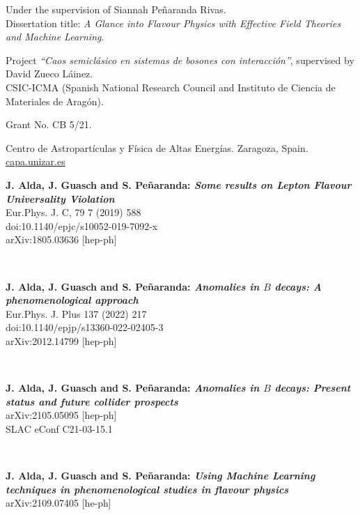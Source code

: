 \documentclass{cvf}
\begin{document}
Under the supervision of Siannah Peñaranda Rivas.\\
Dissertation title: \textit{A Glance into Flavour Physics with Effective Field Theories and Machine Learning}.

Project \textit{``Caos semiclásico en sistemas de bosones con interacción''}, supervised by David Zueco Láinez.\\
CSIC-ICMA (Spanish National Research Council and Instituto de Ciencia de Materiales de Aragón).


Grant No. CB 5/21.

Centro de Astropartículas y Física de Altas Energías. Zaragoza, Spain.\\
\url{capa.unizar.es}



\hspace{\parindent}
\textbf{J. Alda, J. Guasch and S. Peñaranda: \textit{Some results on Lepton Flavour Universality Violation}}\\
Eur.Phys. J. C, 79 7 (2019) 588\\
doi:10.1140/epjc/s10052-019-7092-x\\
arXiv:1805.03636 [hep-ph]

~

\textbf{J. Alda, J. Guasch and S. Peñaranda: \textit{Anomalies in $B$ decays: A phenomenological approach}}\\
Eur.Phys. J. Plus 137 (2022) 217\\
doi:10.1140/epjp/s13360-022-02405-3\\
arXiv:2012.14799 [hep-ph]

~

\textbf{J. Alda, J. Guasch and S. Peñaranda: \textit{Anomalies in $B$ decays: Present status and future collider prospects}}\\
arXiv:2105.05095 [hep-ph]\\
SLAC eConf C21-03-15.1

~

\textbf{J. Alda, J. Guasch and S. Peñaranda: \textit{Using Machine Learning techniques in phenomenological studies in flavour physics}}\\
arXiv:2109.07405 [he-ph]
\end{document}
